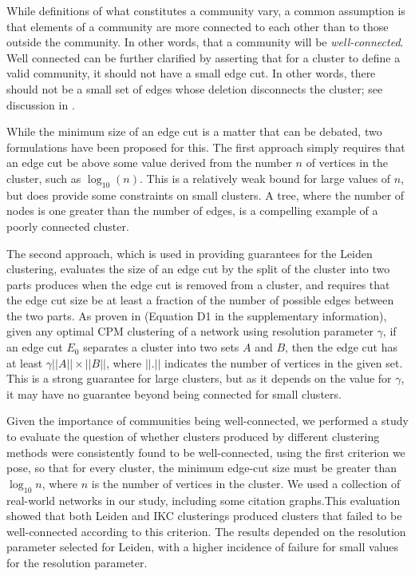 \documentclass[12pt, oneside]{article}   	%
\begin{document}
While definitions of what constitutes a community vary, a common assumption is that elements of a community are more connected to each other than to those outside the community. 
In other words, that a community will be {\em well-connected}. Well connected can be further clarified by asserting that for a cluster to define a valid community, it  should not have a small 
edge cut. In other words, there should not be a small set of edges whose deletion disconnects the cluster; see discussion in \cite{Traag_2019}. 


While the minimum size of an edge cut is a matter that can be debated, two formulations have been proposed for this.
The first approach simply requires that an edge cut be above some value derived from the number $n$ of vertices in the cluster, such as $\log_{10}(n)$. 
This is a relatively weak bound for large values of $n$, but does provide some constraints on small clusters. A tree, where the number of nodes is one greater than the number of edges, is 
a compelling example of a poorly connected cluster. 

The second approach, which is used in providing guarantees for the Leiden clustering, evaluates the size of an edge cut by the split  of the cluster into two parts produces when the edge cut is removed from a cluster, and requires that the
edge cut size be at least a fraction of the number of possible edges between the two  parts.
As proven in \citep{Traag_2019} (Equation D1 in the supplementary information), given any optimal CPM clustering of a network using resolution parameter $\gamma$, if an edge cut $E_0$
separates a cluster into two sets $A$ and $B$, then the edge cut has at least $\gamma ||A|| \times ||B||$, where $||.||$ indicates the number of vertices in the given set.
This is a strong guarantee for large clusters,  but as it depends on the value for $\gamma$, it may have no guarantee  beyond being connected for small clusters. 

Given the importance of communities being well-connected, we performed a study to evaluate the question of whether clusters produced by different clustering methods
were consistently found to be well-connected, using the first criterion we pose, so that for every cluster, the minimum edge-cut size must be greater than $\log_{10}n$, where $n$ is the number of vertices in the cluster. 
We used a collection of real-world networks in our study, including some citation graphs.This evaluation showed that both Leiden and IKC clusterings produced clusters that failed to be well-connected according to this criterion.
The results depended on the resolution parameter selected for Leiden,  with a higher incidence of failure for small values for the resolution parameter.
\end{document}
